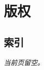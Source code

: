 \documentclass[a4paper,twoside,openleft]{blocksbook}
\begin{document}
\begin{cjkc}
\appendix

\chapter{版权}


\begin{twocolumn}
\chapter{索引}
\printindex
\end{twocolumn}
\begin{onecolumn}



\newpage
\thispagestyle{empty}
\begin{center}
\emph{当前页留空。}
\end{center}
\end{onecolumn}
\end{cjkc}
\end{document}
